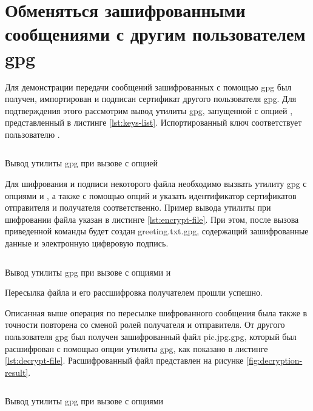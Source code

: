 \section{Обменяться зашифрованными сообщениями с другим пользователем gpg}

Для демонстрации передачи сообщений зашифрованных с помощью gpg был получен, импортирован и подписан сертификат другого пользователя 
gpg. Для подтверждения этого рассмотрим вывод утилиты gpg, запущенной с опцией , представленный в листинге 
\ref{lst:keys-list}. Испортированный ключ соответствует пользователю .

\begin{listing}[H]
    \inputminted{console}{resources/09_keys_list}
    \caption{Вывод утилиты gpg при вызове с опцией }
    \label{lst:keys-list}
\end{listing}

Для шифрования и подписи некоторого файла необходимо вызвать утилиту gpg с опциями  и , а также 
с помощью опций  и  указать идентификатор сертификатов отправителя и получателя соответственно.
Пример вывода утилиты при шифровании файла указан в листинге \ref{lst:encrypt-file}. При этом, после вызова приведенной команды
будет создан greeting.txt.gpg, содержащий зашифрованные данные и электронную цифвровую подпись.

\begin{listing}[H]
    \inputminted{console}{resources/10_encrypt_file}
    \caption{Вывод утилиты gpg при вызове с опциями  и }
    \label{lst:encrypt-file}
\end{listing}

Пересылка файла и его рассшифровка получателем прошли успешно.

Описанная выше операция по пересылке шифрованного сообщения была также в точности повторена со сменой ролей получателя и отправителя.
От другого пользователя gpg был получен зашифрованный файл pic.jpg.gpg, который был расшифрован с помощью опции  
утилиты gpg, как показано в листинге \ref{lst:decrypt-file}. Расшифрованный файл представлен на рисунке \ref{fig:decryption-result}.

\begin{listing}[H]
    \inputminted{console}{resources/11_decrypt_file}
    \caption{Вывод утилиты gpg при вызове с опциями }
    \label{lst:encrypt-file}
\end{listing}

